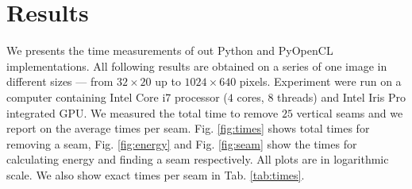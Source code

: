 \documentclass[a4paper,11pt]{article}
\begin{document}
\section{Results}
We presents the time measurements of out Python and PyOpenCL implementations.
All following results are obtained on a series of one image in different sizes — from $32\times20$ up to $1024\times640$ pixels.
Experiment were run on a computer containing Intel Core i7 processor ($4$ cores, $8$ threads) and Intel Iris Pro integrated GPU.
We measured the total time to remove $25$ vertical seams and we report on the average times per seam.
Fig. \ref{fig:times} shows total times for removing a seam, Fig. \ref{fig:energy} and Fig. \ref{fig:seam} show the times for calculating energy and finding a seam respectively.
All plots are in logarithmic scale.
We also show exact times per seam in Tab. \ref{tab:times}.
\end{document}
